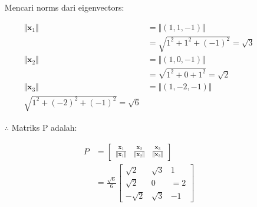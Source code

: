 \documentclass[12pt, a4paper]{scrartcl}
\begin{document}
\begin{enumerate}
            \begin{itemize}
                \item[] Mencari norms dari eigenvectors:
            \end{itemize}
            \begin{align*}
                \Vert\textbf{x}_1\Vert &= \Vert(1,1,-1)\Vert
                \\ &= \sqrt{1^2+1^2+(-1)^2} = \sqrt{3}
                \\ \Vert\textbf{x}_2\Vert &= \Vert(1,0,-1)\Vert
                \\ &= \sqrt{1^2+0+1^2} = \sqrt{2}
                \\ \Vert\textbf{x}_3\Vert &= \Vert(1,-2,-1)\Vert
                \\ \sqrt{1^2 + (-2)^2 + (-1)^2} = \sqrt{6}
            \end{align*}

            \begin{itemize}
                \item[$\therefore$] Matriks P adalah:
            \end{itemize}
            \begin{align*}
                P &= \begin{bmatrix}
                    \frac{\textbf{x}_1}{\Vert\textbf{x}_1\Vert} & \frac{\textbf{x}_2}{\Vert\textbf{x}_2\Vert} & \frac{\textbf{x}_3}{\Vert\textbf{x}_3\Vert}
                \end{bmatrix}
                \\ &= \frac{\sqrt{6}}{6} \begin{bmatrix}
                    \sqrt{2} & \sqrt{3} & 1
                    \\ \sqrt{2} & 0 & =2
                    \\ -\sqrt{2} & \sqrt{3} & -1
                \end{bmatrix}
            \end{align*}

        \end{enumerate}
\end{document}
